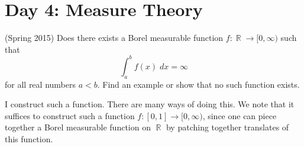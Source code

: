 \documentclass[answers]{exam}
\DeclareMathOperator{\RR}{\mathbb{R}}
\begin{document}
\begin{questions}
\begin{solution}
\begin{comment}
  Let $\epsilon>0$. Since $E$ is measurable and $|E|<\infty$, $\chi_{E}$ is integrable. Since $C_{c}(\R)$ is dense in $L^{1}(\R)$, there exists $g\in C_{c}(\R)$ such that $\norm{g-\chi_{E}}_{L^{1}(\R)}<\epsilon/3$. Since $g$ is continuous and compactly supported, it is unformly continuous. Therefore (again using the fact that $|E|<\infty$) we may choose $\delta>0$ such
  \begin{equation}
    |g(x)-g(y)|< \frac{\epsilon}{3|E|}\label{eq:uniform-continuity}
  \end{equation}
  whenever $|x-y|<\delta$.
Let $r,s\in \R$ such that $|s-r|<\delta$. Writing $f(r)= \int_{\R}\chi_{E}(x)\chi_{E}(x-r)dx$, we have
\begin{align*}
  f(r)-f(s) & = \int_{\R}\chi_{E}(x)\left[\chi_{E}(x-r)-\chi_{E}(x-s)\right]dx\\
            & = \int_{\R}\chi_{E}(x)\left[\chi_{E}(x-r)-g(x-r)+g(x-r)-g(x-s)+g(x-s)-\chi_{E}(x-s)\right]dx.
\end{align*}
Therefore by the triangle inequality,
\begin{align*}
  |f(r)-f(s)| &\leq \int_{\R}\chi_{E}(x)|\chi_{E}(x-r)-g(x-r)|dx + \int_{\R}\chi_{E}(x)|g(x-r)-g(x-s)|dx \\ 
  &\quad +\int_{\R}\chi_{E}|g(x-s)-\chi_{E}(x-s)|dx.\\
              &\leq \int_{\R}|\chi_{E}(x-r)-g(x-r)|dx + \int_{E}|g(x-r)-g(x-s)|dx \\\quad &+\int_{\R}|g(x-s)-\chi_{E}(x-s)|dx.
\end{align*}
By translation invariance (i.e. do a u-substitution), the first and third integrals both equal  $\int_{\R}|\chi_{E}(x)-g(x)|dx < \epsilon/3$. By \eqref{eq:uniform-continuity}, the second integral is less than $\epsilon/3$. Therefore $|f(r)-f(s)|<\epsilon$. We have shown that $\delta$ responds to the $\epsilon$-challenge in the definition of continuity. Therefore $f$ is continuous.
\end{comment}
\end{solution}

\newpage
\section{Day 4: Measure Theory}


\question (Spring 2015) Does there exists a Borel measurable function $f: \RR \to [0,\infty)$ such that
%
\[ \int_a^b f(x)\; dx = \infty \]
%
for all real numbers $a < b$. Find an example or show that no such function exists.
\begin{solution}
    I construct such a function. There are many ways of doing this. We note that it suffices to construct such a function $f: [0,1] \to [0,\infty)$, since one can piece together a Borel measurable function on $\RR$ by patching together translates of this function.
    

\end{solution}
\end{questions}
\end{document}
